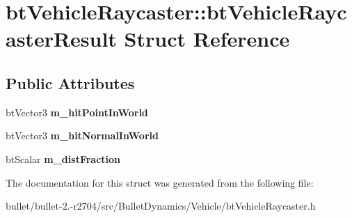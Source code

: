 \hypertarget{structbt_vehicle_raycaster_1_1bt_vehicle_raycaster_result}{\section{bt\+Vehicle\+Raycaster\+:\+:bt\+Vehicle\+Raycaster\+Result Struct Reference}
\label{structbt_vehicle_raycaster_1_1bt_vehicle_raycaster_result}
}
\subsection*{Public Attributes}
\begin{DoxyCompactItemize}
\item 
\hypertarget{structbt_vehicle_raycaster_1_1bt_vehicle_raycaster_result_aa524cc6ed69db849b5b4f8887114bb9b}{bt\+Vector3 {\bfseries m\+\_\+hit\+Point\+In\+World}}\label{structbt_vehicle_raycaster_1_1bt_vehicle_raycaster_result_aa524cc6ed69db849b5b4f8887114bb9b}

\item 
\hypertarget{structbt_vehicle_raycaster_1_1bt_vehicle_raycaster_result_a7bae9a60b535b4a13a61faca33fe4381}{bt\+Vector3 {\bfseries m\+\_\+hit\+Normal\+In\+World}}\label{structbt_vehicle_raycaster_1_1bt_vehicle_raycaster_result_a7bae9a60b535b4a13a61faca33fe4381}

\item 
\hypertarget{structbt_vehicle_raycaster_1_1bt_vehicle_raycaster_result_a3365bc5454d1c213342eb654d9e9f679}{bt\+Scalar {\bfseries m\+\_\+dist\+Fraction}}\label{structbt_vehicle_raycaster_1_1bt_vehicle_raycaster_result_a3365bc5454d1c213342eb654d9e9f679}

\end{DoxyCompactItemize}


The documentation for this struct was generated from the following file\+:\begin{DoxyCompactItemize}
\item 
bullet/bullet-\/2.-\/r2704/src/\+Bullet\+Dynamics/\+Vehicle/bt\+Vehicle\+Raycaster.\+h\end{DoxyCompactItemize}
